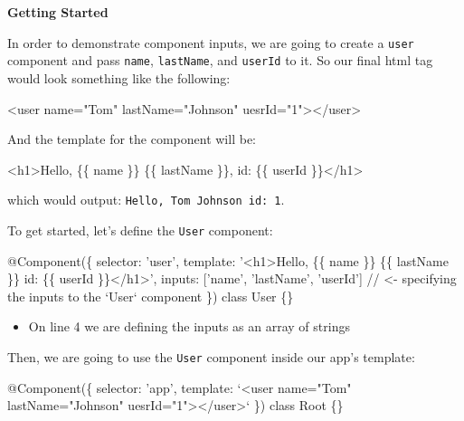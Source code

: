 \documentclass[12pt,]{article}
\newenvironment{Shaded}{}{}
\newcommand{\KeywordTok}[1]{\textcolor[rgb]{0.00,0.00,1.00}{{#1}}}
\newcommand{\StringTok}[1]{\textcolor[rgb]{0.00,0.50,0.50}{{#1}}}
\newcommand{\CommentTok}[1]{\textcolor[rgb]{0.00,0.50,0.00}{{#1}}}
\newcommand{\OtherTok}[1]{\textcolor[rgb]{1.00,0.25,0.00}{{#1}}}
\newcommand{\FunctionTok}[1]{{#1}}
\newcommand{\NormalTok}[1]{{#1}}
\providecommand{\tightlist}{%
  \setlength{\itemsep}{0pt}\setlength{\parskip}{0pt}}
\begin{document}
\textbf{Getting Started}

In order to demonstrate component inputs, we are going to create a
\texttt{user} component and pass \texttt{name}, \texttt{lastName}, and
\texttt{userId} to it. So our final html tag would look something like
the following:

\begin{Shaded}
\begin{Highlighting}[numbers=left,,]
\KeywordTok{<user}\OtherTok{ name=}\StringTok{"Tom"}\OtherTok{ lastName=}\StringTok{"Johnson"}\OtherTok{ uesrId=}\StringTok{"1"}\KeywordTok{></user>}
\end{Highlighting}
\end{Shaded}

And the template for the component will be:

\begin{Shaded}
\begin{Highlighting}[numbers=left,,]
\KeywordTok{<h1>}\NormalTok{Hello, \{\{ name \}\} \{\{ lastName \}\}, id: \{\{ userId \}\}}\KeywordTok{</h1>}
\end{Highlighting}
\end{Shaded}

which would output: \texttt{Hello,\ Tom\ Johnson\ id:\ 1}.

To get started, let's define the \texttt{User} component:

\begin{Shaded}
\begin{Highlighting}[numbers=left,,]
\FunctionTok{@Component}\NormalTok{(\{}
  \NormalTok{selector: 'user',}
  \NormalTok{template: '<h1>Hello, \{\{ name \}\} \{\{ lastName \}\} id: \{\{ userId \}\}</h1>',}
  \NormalTok{inputs: ['name', 'lastName', 'userId'] }\CommentTok{// <- specifying the inputs to the `User` component}
\NormalTok{\})}
\KeywordTok{class} \NormalTok{User \{\}}
\end{Highlighting}
\end{Shaded}

\begin{itemize}
\tightlist
\item
  On line 4 we are defining the inputs as an array of strings
\end{itemize}

Then, we are going to use the \texttt{User} component inside our app's
template:

\begin{Shaded}
\begin{Highlighting}[numbers=left,,]
\FunctionTok{@Component}\NormalTok{(\{}
  \NormalTok{selector: 'app',}
  \NormalTok{template: `<user name=}\StringTok{"Tom"} \NormalTok{lastName=}\StringTok{"Johnson"} \NormalTok{uesrId=}\StringTok{"1"}\NormalTok{></user>`}
\NormalTok{\})}
\KeywordTok{class} \NormalTok{Root \{\}}
\end{Highlighting}
\end{Shaded}
\end{document}

